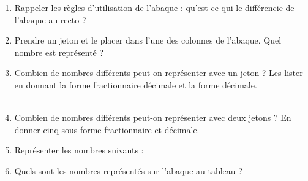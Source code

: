 \begin{enigme}
       \begin{enumerate}
          \item Rappeler les règles d'utilisation de l'abaque : qu'est-ce qui le différencie de l'abaque au recto ?
          \item Prendre un jeton et le placer dans l'une des colonnes de l'abaque. Quel nombre est représenté ? \\ [1mm]
             \makebox[\linewidth]{\dotfill} \medskip
          \item Combien de nombres différents peut-on représenter avec un jeton ? Les lister en donnant la forme fractionnaire décimale et la forme décimale. \\ [2mm]
             \makebox[\linewidth]{\dotfill} \\ [4mm]
             \makebox[\linewidth]{\dotfill} \bigskip
          \item Combien de nombres différents peut-on représenter avec deux jetons ? En donner cinq sous forme fractionnaire et décimale. \\ [2mm]
             \makebox[\linewidth]{\dotfill} \bigskip
          \item Représenter les nombres suivants :
          \item Quels sont les nombres représentés sur l'abaque au tableau ? \\ [2mm]
             \makebox[\linewidth]{\dotfill}
       \end{enumerate}
    \end{enigme}
